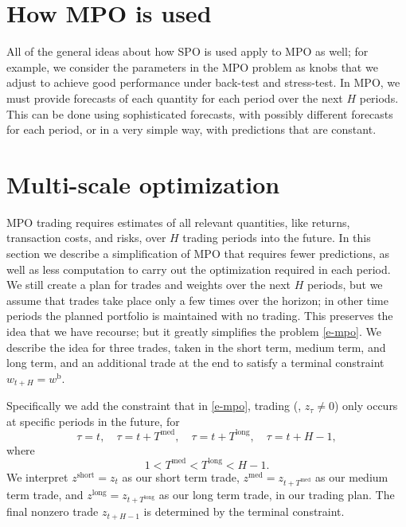 \documentclass[openany]{article}  %
\newcommand{\wb}{w^\mathrm{b}}
\begin{document}
\section{How MPO is used}
All of the general ideas about how SPO is used apply to MPO as well;
for example, we consider the parameters in the MPO problem as knobs that we adjust
to achieve good performance under back-test and stress-test.
In MPO, we must provide forecasts of each quantity for each period over the
next $H$ periods.  This can be done using sophisticated forecasts, with possibly
different forecasts for each period, or in a very simple way,
with predictions that are constant.

\section{Multi-scale optimization}\label{s-mso}

MPO trading requires estimates of all relevant quantities,
like returns, transaction costs, and risks, over $H$ trading periods
into the future.
In this section we describe a simplification of MPO that requires
fewer predictions, as well as less computation to carry out the
optimization required in each period.
We still create a plan for trades and weights
over the next $H$ periods, but we assume that
trades take place only a few times over the horizon;
in other time periods the planned portfolio is maintained with no trading.
This preserves the idea that we have recourse; but it greatly
simplifies the problem \eqref{e-mpo}.
We describe the idea for three trades, taken in the short term,
medium term, and long term, and an additional
trade at the end to satisfy a terminal constraint $w_{t+H}=\wb$.

Specifically we add the constraint that in \eqref{e-mpo}, trading
(\ie, $z_\tau \neq 0$) only
occurs at specific periods in the future, for
\[
\tau =t, \quad \tau=t+T^\mathrm{med}, \quad \tau=t+T^\mathrm{long},
\quad \tau= t+ H-1,
\]
where
\[
1< T^\mathrm{med} <T^\mathrm{long} < H-1.
\]
We interpret $z^\mathrm{short}= z_t$ as our short term trade,
$z^\mathrm{med} = z_{t+T^\mathrm{med}}$ as our medium term trade,
and $z^\mathrm{long} = z_{t+T^\mathrm{long}}$ as our long term trade,
in our trading plan.  The final nonzero trade $z_{t+H-1}$ is determined
by the terminal constraint.
\end{document}
